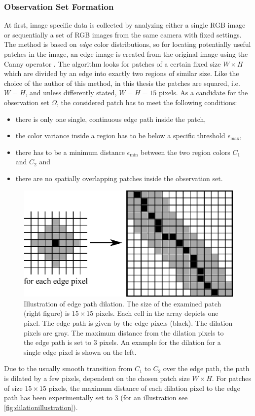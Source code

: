 \subsubsection{Observation Set Formation}
\label{subsubsec:osf}
At first, image specific data is collected by analyzing either a single RGB image or sequentially a set of RGB images from the same camera with fixed settings. The method is based on \emph{edge} color distributions, so for locating potentially useful patches in the image, an edge image is created from the original image using the Canny operator \cite{canny1987computational}. The algorithm looks for patches of a certain fixed size $W \times H$ which are divided by an edge into exactly two regions of similar size. Like the choice of the author of this method, in this thesis the patches are squared, \hbox{i.e.} $W = H$, and unless differently stated, $W = H = 15$ pixels. As a candidate for the observation set $\Omega$, the considered patch has to meet the following conditions:
\begin{itemize}
	\item there is only one single, continuous edge path inside the patch,
	\item the color variance inside a region has to be below a specific threshold $\epsilon_\text{max}$,
	\item there has to be a minimum distance $\epsilon_\text{min}$ between the two region colors $C_1$ and $C_2$ and
	\item there are no spatially overlapping patches inside the observation set.
\end{itemize}
\begin{figure}
	\centering
	\includegraphics[width=0.5\linewidth]{images/dilation_illustration.pdf}
	\caption[Illustration of edge path dilation]{Illustration of edge path dilation. The size of the examined patch (right figure) is $15 \times 15$ pixels. Each cell in the array depicts one pixel. The edge path is given by the edge pixels (black). The dilation pixels are gray. The maximum distance from the dilation pixels to the edge path is set to 3 pixels. An example for the dilation for a single edge pixel is shown on the left.}
	\label{fig:dilationillustration}
\end{figure}
Due to the usually smooth transition from $C_1$ to $C_2$ over the edge path, the path is dilated by a few pixels, dependent on the chosen patch size $W \times H$. For patches of size $15 \times 15$ pixels, the maximum distance of each dilation pixel to the edge path has been experimentally set to 3 (for an illustration see \autoref{fig:dilationillustration}). 

